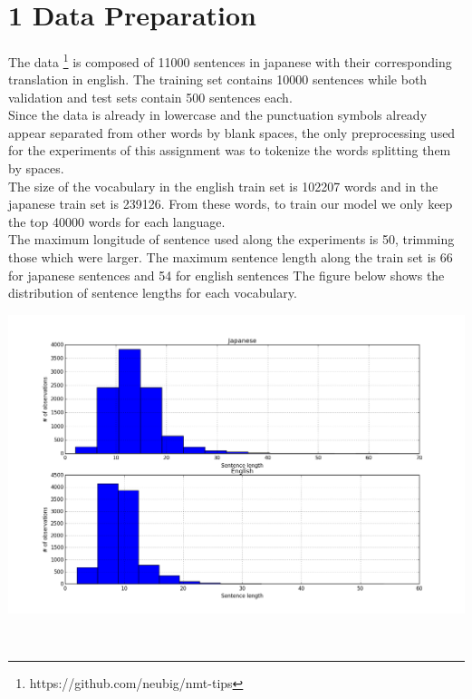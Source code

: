\documentclass{article}
\title{
    \vspace{2in}
    \textmd{\textbf{\hmwkClass}}\\
    \vspace{0.1in}
    \textmd{\textbf{\hmwkTitle}}\\     
    \vspace{3in}
}
\author{\textbf{\hmwkAuthorName}\\
		{\texttt{\hmwkNetID}}
}
\date{}
\begin{document}
\maketitle

\pagebreak

{\section{1 Data Preparation}}

The data \footnote{https://github.com/neubig/nmt-tips} is composed of 11000 sentences in japanese with their corresponding translation in english. The training set contains 10000 sentences while both validation and test sets contain 500 sentences each. \\

Since the data is already in lowercase and the punctuation symbols already appear separated from other words by blank spaces, the only preprocessing used for the experiments of this assignment was to tokenize the words splitting them by spaces. \\

The size of the vocabulary in the english train set is 102207 words and in the japanese train set is 239126. From these words, to train our model we only keep the top 40000 words for each language. \\

The maximum longitude of sentence used along the experiments is 50, trimming those which were larger. The maximum sentence length along the train set is 66 for japanese sentences and 54 for english sentences The figure below shows the distribution of sentence lengths for each vocabulary.

\begin{center}\includegraphics[scale=0.4]{sentence_len}\label{Sentence_Lengths}\end{center}\
\end{document}

